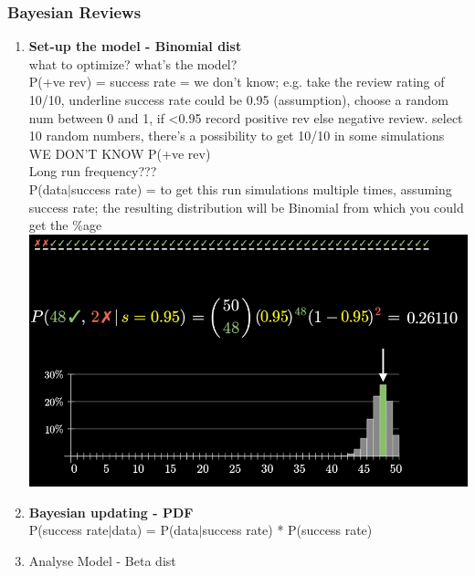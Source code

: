 \documentclass{beamer}
\begin{document}
\begin{frame}[allowframebreaks]\frametitle{Bayesian Reviews}
	\begin{enumerate}
		\item \textbf{Set-up the model - Binomial dist}\\
		what to optimize? what's the model?\\
		P(+ve rev) = success rate = we don't know; e.g. take the review rating of 10/10, underline success rate could be 0.95 (assumption), choose a random num between 0 and 1, if <0.95 record positive rev else negative review. select 10 random numbers, there's a possibility to get 10/10 in some simulations\\
		WE DON'T KNOW P(+ve rev)\\
		Long run frequency???\\
		
		P(data$|$success rate) = to get this run simulations multiple times, assuming success rate; the resulting distribution will be Binomial from which you could get the \%age\\
		\includegraphics[scale=0.2]{reviews}\\
		

		\item \textbf{Bayesian updating - PDF}\\
		P(success rate$|$data) = P(data$|$success rate) * P(success rate)
	
		\item 	Analyse Model - Beta dist		
	\end{enumerate}
	
\end{frame}







\end{document}
